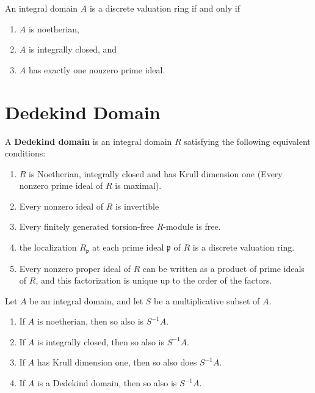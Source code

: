 \begin{theorem}
    An integral domain $A$ is a discrete valuation ring if and only if
    \begin{enumerate}[label=(\roman*)]
        \item  $A$ is noetherian,
        \item  $A$ is integrally closed, and
        \item  $A$ has exactly one nonzero prime ideal.
    \end{enumerate}
\end{theorem}




\section{Dedekind Domain}
\begin{definition}
    A \textbf{Dedekind domain} is an integral domain $R$ satisfying the following equivalent conditions:
    \begin{enumerate}
        \item
              $R$ is Noetherian, integrally closed and has Krull dimension one (Every nonzero prime ideal of $R$ is maximal).
        \item
              Every nonzero ideal of $R$ is invertible
        \item
              Every finitely generated torsion-free $R$-module is free.
        \item
              the localization $R_{\mathfrak{p}}$ at each prime ideal $\mathfrak{p}$ of $R$ is a discrete valuation ring.
        \item
              Every nonzero proper ideal of $R$ can be written as a product of prime ideals of $R$, and this factorization is unique up to the order of the factors.
    \end{enumerate}
\end{definition}


\begin{proposition}
    Let $A$ be an integral domain, and let $S$ be a multiplicative subset of $A$.
    \begin{enumerate}
        \item If $A$ is noetherian, then so also is $S^{-1} A$.
        \item If $A$ is integrally closed, then so also is $S^{-1} A$.
        \item If $A$ has Krull dimension one, then so also does $S^{-1} A$.
        \item If $A$ is a Dedekind domain, then so also is $S^{-1} A$.
    \end{enumerate}
\end{proposition}

